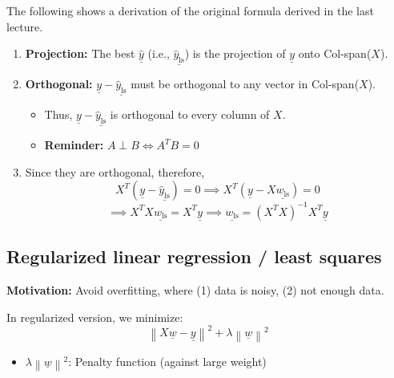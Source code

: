     \begin{derivation}
        The following shows a derivation of the original formula derived in the last lecture. 

        \begin{enumerate}
            \item \textbf{Projection:} The best \( \underline{\hat{y}} \) (i.e., \( \underline{\hat{y}_{\text{ls}}} \)) is the projection of \( \underline{y} \) onto Col-span(\(X\)).

            \item \textbf{Orthogonal:} \( \underline{y} - \underline{\hat{y}_{\text{ls}}} \) must be orthogonal to any vector in Col-span(\(X\)).
            \begin{itemize}
                \item Thus, \( \underline{y} - \underline{\hat{y}_{\text{ls}}} \) is orthogonal to every column of \( X \).
                \item \textbf{Reminder:} \( A \perp B \iff A^T B = 0 \)
            \end{itemize}
        
            \item Since they are orthogonal, therefore, 
            \[
            X^T (\underline{y} - \underline{\hat{y}_{\text{ls}}}) = 0 \implies X^T (\underline{y} - X \underline{w_{\text{ls}}}) = 0
            \]
            \[
            \implies X^T X \underline{w_{\text{ls}}} = X^T \underline{y} \implies \underline{w_{\text{ls}}} = (X^T X)^{-1} X^T \underline{y}
            \]
        \end{enumerate}
    \end{derivation}

\subsection{Regularized linear regression / least squares}
\textbf{Motivation:} Avoid overfitting, where (1) data is noisy, (2) not enough data.
\begin{definition}
    In regularized version, we minimize:
    \[
    \left\| X \underline{w} - \underline{y} \right\|^2 + \lambda \left\| \underline{w} \right\|^2
    \]
    \begin{itemize}
        \item $\lambda \left\| \underline{w} \right\|^2$: Penalty function (against large weight)
    \end{itemize}
\end{definition}

